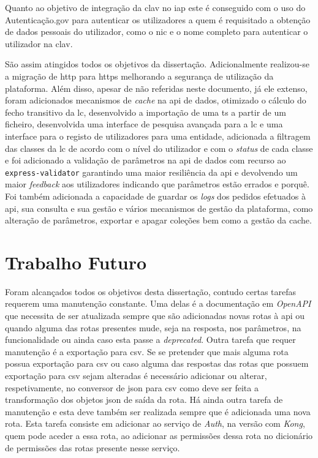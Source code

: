 Quanto ao objetivo de integração da \acrshort{clav} no \acrshort{iap} este é conseguido com o uso do Autenticação.gov para autenticar os utilizadores a quem é requisitado a obtenção de dados pessoais do utilizador, como o \acrshort{nic} e o nome completo para autenticar o utilizador na \acrshort{clav}.

São assim atingidos todos os objetivos da dissertação. Adicionalmente realizou-se a migração de \acrshort{http} para \acrshort{https} melhorando a segurança de utilização da plataforma. Além disso, apesar de não referidas neste documento, já ele extenso, foram adicionados mecanismos de \textit{cache} na \acrshort{api} de dados, otimizado o cálculo do fecho transitivo da \acrshort{lc}, desenvolvido a importação de uma \acrshort{ts} a partir de um ficheiro, desenvolvida uma interface de pesquisa avançada para a \acrshort{lc} e uma interface para o registo de utilizadores para uma entidade, adicionada a filtragem das classes da \acrshort{lc} de acordo com o nível do utilizador e com o \textit{status} de cada classe e foi adicionado a validação de parâmetros na \acrshort{api} de dados com recurso ao \texttt{express-validator} garantindo uma maior resiliência da \acrshort{api} e devolvendo um maior \textit{feedback} aos utilizadores indicando que parâmetros estão errados e porquê. Foi também adicionada a capacidade de guardar os \textit{logs} dos pedidos efetuados à \acrshort{api}, sua consulta e sua gestão e vários mecanismos de gestão da plataforma, como alteração de parâmetros, exportar e apagar coleções bem como a gestão da cache.

\section{Trabalho Futuro}

Foram alcançados todos os objetivos desta dissertação, contudo certas tarefas requerem uma manutenção constante. Uma delas é a documentação em \textit{OpenAPI} que necessita de ser atualizada sempre que são adicionadas novas rotas à \acrshort{api} ou quando alguma das rotas presentes mude, seja na resposta, nos parâmetros, na funcionalidade ou ainda caso esta passe a \textit{deprecated}. Outra tarefa que requer manutenção é a exportação para \acrshort{csv}. Se se pretender que mais alguma rota possua exportação para \acrshort{csv} ou caso alguma das respostas das rotas que possuem exportação para \acrshort{csv} sejam alteradas é necessário adicionar ou alterar, respetivamente, no conversor de \acrshort{json} para \acrshort{csv} como deve ser feita a transformação dos objetos \acrshort{json} de saída da rota. Há ainda outra tarefa de manutenção e esta deve também ser realizada sempre que é adicionada uma nova rota. Esta tarefa consiste em adicionar ao serviço de \textit{Auth}, na versão com \textit{Kong}, quem pode aceder a essa rota, ao adicionar as permissões dessa rota no dicionário de permissões das rotas presente nesse serviço.

